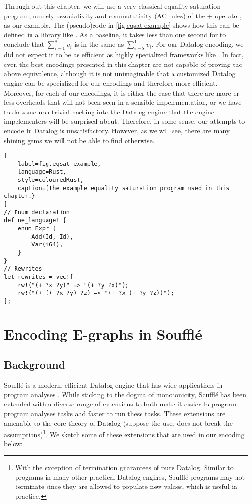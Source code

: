 Through out this chapter, we will use a very classical equality saturation program,
 namely associativity and commutativity (AC rules) of the $+$ operator, as our example.
The (pseudo)code in \autoref{fig:eqsat-example} shows how this can be defined in a library like \egg.
As a baseline, it takes less than one second for \egg to conclude that
 $\sum_{i=1}^{8}v_i$ is in the same \eclass as $\sum_{i=8}^{1}v_i$.
For our Datalog encoding,
 we did not expect it to be as efficient as highly specialized \egraph frameworks like \egg.
In fact, even the best encodings presented in this chapter
 are not capable of proving the above equivalence,
 although it is not unimaginable that a customized Datalog engine can be specialized
 for our \egraph encodings and therefore more efficient.
Moreover,
 for each of our encodings,
 it is either the case that there are more or less overheads 
 that will not been seen in a sensible \egraph impelementation,
 or we have to do some non-trivial hacking into the Datalog engine that 
 the engine impelementers will be surprised about.
Therefore, in some sense,
 our attempts to encode \egraphs in Datalog is unsatisfactory.
However, 
 as we will see,
 there are many shining gems we will not be able to find otherwise.

\begin{lstlisting}[
    label=fig:eqsat-example,
    language=Rust, 
    style=colouredRust, 
    caption={The example equality saturation program used in this chapter.}
]
// Enum declaration
define_language! {
    enum Expr {
        Add(Id, Id),
        Var(i64),
    }
}
// Rewrites
let rewrites = vec![
    rw!("(+ ?x ?y)" => "(+ ?y ?x)");
    rw!("(+ (+ ?x ?y) ?z) => "(+ ?x (+ ?y ?z))");
];
\end{lstlisting}

\section{Encoding E-graphs in Souffl\'e}

\subsection{Background}

Souffl\'e is a modern, efficient Datalog engine 
 that has wide applications in program analyses \citep{doop, souffle, souffle-interpreter}.
While sticking to the dogma of monotonicity, 
 Souffl\'e has been extended with a diverse range of extensions
 to both make it easier to program program analyses tasks
 and faster to run these tasks.
These extensions are amenable to the core theory of Datalog 
 (suppose the user does not break the assumptions)\footnote{With the exception
 of termination guarantees of pure Datalog. 
 Similar to programs in many other practical Datalog engines, 
 Souffl\'e programs may not terminate
 since they are allowed to populate new values, which is useful in practice.}.
We sketch some of these extensions that are used in our encoding below:

